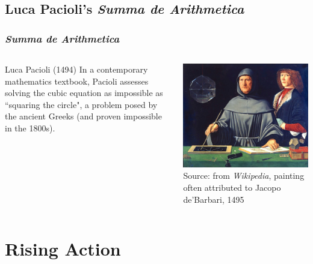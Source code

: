\documentclass{beamer}
\begin{document}
\subsection{Luca Pacioli's {\it Summa de Arithmetica}} 
\begin{frame}
\frametitle{{\it Summa de Arithmetica}}

\begin{columns}[c]
\begin{block}{Luca Pacioli (1494)}
    In a contemporary mathematics textbook, Pacioli assesses solving the cubic
    equation as impossible as ``squaring the circle", a problem posed by
    the ancient Greeks (and proven impossible in the 1800s).
\end{block}

\includegraphics[width=\textwidth]{Luca-Pacioli}\\[-1ex]
{\tiny Source: from \emph{Wikipedia}, painting often attributed to Jacopo
de'Barbari, 1495 }
\end{columns}
\end{frame}


\section{Rising Action}
\end{document}
